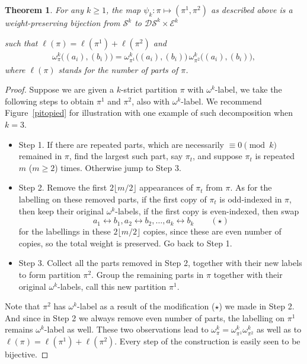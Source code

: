 \documentclass[12pt]{amsart}
\numberwithin{equation}{section}
\theoremstyle{plain}
\newtheorem{theorem}{Theorem}[section]
\theoremstyle{definition}
\begin{document}
\begin{theorem}\label{decomp1}
For any $k\geq 1$, the map $\psi_k: \pi \longmapsto (\pi^1, \pi^2)$ as described above is a weight-preserving bijection from $\mathcal{S}^k$ to 
$\mathcal{DS}^k\times \mathcal{E}^k$




such that $\ell(\pi)=\ell(\pi^1)+\ell(\pi^2)$ and
\begin{align}\label{decomp1-eq}
\omega^k_{\pi}\big((a_i), (b_i)\big) =\omega^k_{\pi^1}\big((a_i), (b_i)\big)\, \omega^k_{\pi^2}\big((a_i), (b_i)\big) , 
\end{align} 
where $\ell(\pi)$ stands for the number of parts of $\pi$.
\end{theorem}
\begin{proof}
Suppose we are given a $k$-strict partition $\pi$ with $\omega^k$-label, we take the following steps to obtain $\pi^1$ and $\pi^2$, also with $\omega^k$-label. We recommend Figure~\ref{pitopied} for illustration with one example of such decomposition when $k=3$.
\begin{itemize}
\item Step 1. If there are repeated parts, which are necessarily $\equiv 0 \pmod k$ remained in $\pi$, find the largest such part, say $\pi_t$, and suppose $\pi_t$ is repeated $m$ ($m\geq 2$) times. Otherwise jump to Step 3.
\item Step 2. Remove the first $2\lfloor {m}/{2} \rfloor$ appearances of $\pi_t$ from $\pi$. As for the labelling on these removed parts, if the first copy of $\pi_t$ is odd-indexed in $\pi$, then keep their original $\omega^k$-labels, if the first copy is even-indexed, then swap
$$
a_1\leftrightarrow b_1, a_2\leftrightarrow b_2, \ldots, a_k\leftrightarrow b_k \qquad (\star)
$$
for the labellings in these $2\lfloor {m}/{2} \rfloor$ copies, since these are even number of copies, so the total weight is preserved. Go back to Step 1.
\item Step 3. Collect all the parts removed in Step 2, together with their new labels to form partition $\pi^2$. Group the remaining parts in $\pi$ together with their original $\omega^k$-labels, call this new partition $\pi^1$.
\end{itemize}
Note that $\pi^2$ has $\omega^k$-label as a result of the modification ($\star$) we made in Step 2. And since in Step 2 we always remove even number of parts, the labelling on $\pi^1$ remains $\omega^k$-label as well. 
These two observations lead to $\omega^k_{\pi}=\omega^k_{\pi^1}\omega^k_{\pi^2}$
as well as to  $\ell(\pi)=\ell(\pi^1)+\ell(\pi^2)$. Every step of the construction is easily seen to be bijective. 
\end{proof}
\end{document}
